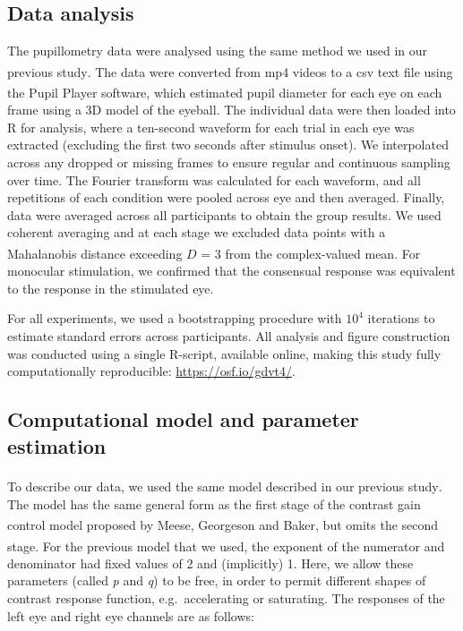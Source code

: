 \documentclass[
]{article}
\begin{document}
\subsection{Data analysis}\label{data-analysis}

The pupillometry data were analysed using the same method we used in our previous study\textsuperscript{}. The data were converted from mp4 videos to a csv text file using the Pupil Player software\textsuperscript{}, which estimated pupil diameter for each eye on each frame using a 3D model of the eyeball. The individual data were then loaded into R for analysis, where a ten-second waveform for each trial in each eye was extracted (excluding the first two seconds after stimulus onset). We interpolated across any dropped or missing frames to ensure regular and continuous sampling over time. The Fourier transform was calculated for each waveform, and all repetitions of each condition were pooled across eye and then averaged. Finally, data were averaged across all participants to obtain the group results. We used coherent averaging and at each stage we excluded data points with a Mahalanobis distance exceeding \(D\) = 3 from the complex-valued mean\textsuperscript{}. For monocular stimulation, we confirmed that the consensual response was equivalent to the response in the stimulated eye.

For all experiments, we used a bootstrapping procedure with \ensuremath{10^{4}} iterations to estimate standard errors across participants. All analysis and figure construction was conducted using a single R-script, available online, making this study fully computationally reproducible: \url{https://osf.io/gdvt4/}.

\subsection{Computational model and parameter estimation}\label{computational-model-and-parameter-estimation}

To describe our data, we used the same model described in our previous study\textsuperscript{}. The model has the same general form as the first stage of the contrast gain control model proposed by Meese, Georgeson and Baker\textsuperscript{}, but omits the second stage. For the previous model that we used\textsuperscript{}, the exponent of the numerator and denominator had fixed values of 2 and (implicitly) 1. Here, we allow these parameters (called \emph{p} and \emph{q}) to be free, in order to permit different shapes of contrast response function, e.g.~accelerating or saturating. The responses of the left eye and right eye channels are as follows:
\end{document}
